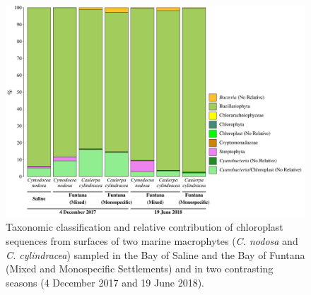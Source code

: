 \documentclass[12pt,]{article}
\begin{document}
\newpage
\begin{figure}[ht]

{\centering \includegraphics[width=1\linewidth]{../results/figures/chloroplast} 

}

\caption{Taxonomic classification and relative contribution of chloroplast sequences from surfaces of two marine macrophytes (\textit{C. nodosa} and \textit{C. cylindracea}) sampled in the Bay of Saline and the Bay of Funtana (Mixed and Monospecific Settlements) and in two contrasting seasons (4 December 2017 and 19 June 2018).\label{chloroplast}}\label{fig:unnamed-chunk-4}
\end{figure}
\end{document}

